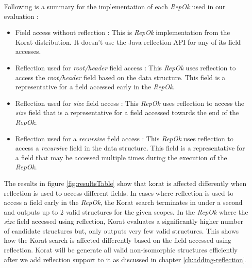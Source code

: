 \par
\noindent Following is a summary for the implementation of each
\emph{RepOk} used in our evaluation :
\begin{itemize}
\item Field access without reflection : This is \emph{RepOk}
  implementation from the Korat distribution. It doesn't use the Java
  reflection API for any of its field accesses.
\item Reflection used for \emph{root/header} field access : This
  \emph{RepOk} uses reflection to access the \emph{root/header} field
  based on the data structure. This field is a representative for a
  field accessed early in the \emph{RepOk}.
\item Reflection used for \emph{size} field access : This \emph{RepOk}
  uses reflection to access the \emph{size} field that is a
  representative for a field accessed towards the end of the
  \emph{RepOk}.
\item Reflection used for a \emph{recursive} field access : This
  \emph{RepOk} uses reflection to access a \emph{recursive} field in
  the data structure. This field is a representative for a field that
  may be accessed multiple times during the execution of the
  \emph{RepOk}.
\end{itemize}


\para The results in figure \ref{fig:resultsTable} show that korat is
affected differently when reflection is used to access different
fields. In cases where reflection is used to access a field early in
the \emph{RepOk}, the Korat search terminates in under a second and
outputs up to 2 valid structures for the given scopes. In the
\emph{RepOk} where the \emph{size} field accessed using reflection,
Korat evaluates a significantly higher number of candidate structures
but, only outputs very few valid structures. This shows how the Korat
search is affected differently based on the field accessed using
reflection. Korat will be generate all valid non-isomorphic structures
efficiently after we add reflection support to it as discussed in
chapter \ref{ch:adding-reflection}.


